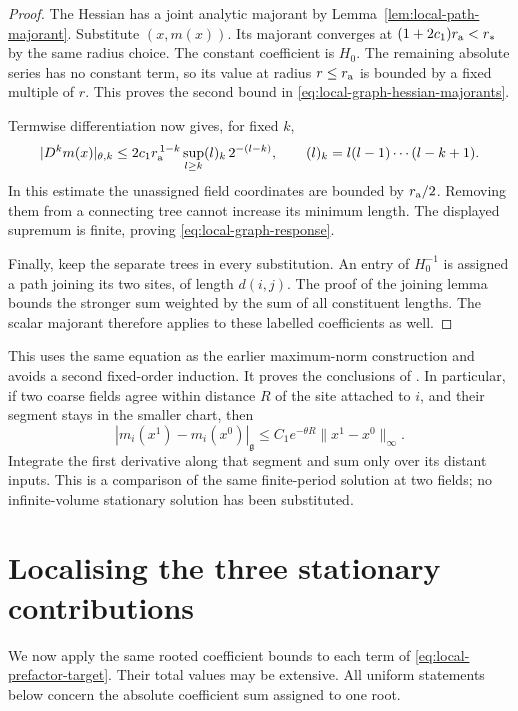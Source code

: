 \documentclass[11pt,reqno]{amsart}
\numberwithin{equation}{section}
\theoremstyle{definition}
\theoremstyle{remark}
\newcommand{\g}{\mathfrak g}
\begin{document}
\begin{proof}
The Hessian has a joint analytic majorant by
Lemma~\ref{lem:local-path-majorant}.
Substitute \((x,m(x))\). Its majorant converges at
\((1+2c_1)r_{\rm a}<r_*\) by the same radius choice.
The constant coefficient is \(H_0\).
The remaining absolute series has no constant term,
so its value at radius \(r\le r_{\rm a}\) is
bounded by a fixed multiple of \(r\).
This proves the second bound in
\eqref{eq:local-graph-hessian-majorants}.

Termwise differentiation now gives, for fixed \(k\),
\[
 |D^km(x)|_{\theta,k}
  \le2c_1r_{\rm a}^{\,1-k}
        \sup_{l\ge k}(l)_k\,2^{-(l-k)} ,
 \qquad
 (l)_k=l(l-1)\cdots(l-k+1).
\]
In this estimate the unassigned field coordinates
are bounded by \(r_{\rm a}/2\).
Removing them from a connecting tree cannot
increase its minimum length.
The displayed supremum is finite, proving
\eqref{eq:local-graph-response}.

Finally, keep the separate trees in every substitution.
An entry of \(H_0^{-1}\) is assigned a path joining
its two sites, of length \(d(i,j)\).
The proof of the joining lemma bounds the stronger
sum weighted by the sum of all constituent lengths.
The scalar majorant therefore applies to these
labelled coefficients as well.
\end{proof}

This uses the same equation as the earlier
maximum-norm construction and avoids a second
fixed-order induction.
It proves the conclusions of
\cite[Proposition~16.2 and Lemma~16.3,
pp.~79--81]{Main}.
In particular, if two coarse fields agree within
distance \(R\) of the site attached to \(i\), and
their segment stays in the smaller chart, then
\begin{equation}
       |m_i(x^1)-m_i(x^0)|_{\g}
            \le C_1e^{-\theta R}
                         \|x^1-x^0\|_\infty .
 \label{eq:local-distant-response}
\end{equation}
Integrate the first derivative along that segment
and sum only over its distant inputs.
This is a comparison of the same finite-period
solution at two fields; no infinite-volume
stationary solution has been substituted.


\section{Localising the three stationary contributions}
\label{sec:local-stationary-prefactor}

We now apply the same rooted coefficient bounds to
each term of \eqref{eq:local-prefactor-target}.
Their total values may be extensive.
All uniform statements below concern the absolute
coefficient sum assigned to one root.
\end{document}
